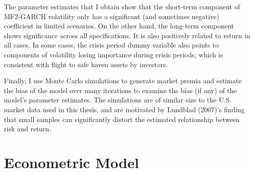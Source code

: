 \documentclass[12pt]{article}
\begin{document}
The parameter estimates that I obtain show that the short-term component of MF2-GARCH volatility only has a significant (and sometimes negative) coefficient in limited scenarios. On the other hand, the long-term component shows significance across all specifications. It is also positively related to return in all cases. In some cases, the crisis period dummy variable also points to components of volatility losing importance during crisis periods, which is consistent with flight to safe haven assets by investors.\par
Finally, I use Monte Carlo simulations to generate market premia and estimate the bias of the model over many iterations to examine the bias (if any) of the model's parameter estimates. The simulations are of similar size to the U.S. market data used in this thesis, and are motivated by Lundblad (2007)'s finding that small samples can significantly distort the estimated relationship between risk and return.\par


\section{Econometric Model}
\end{document}
